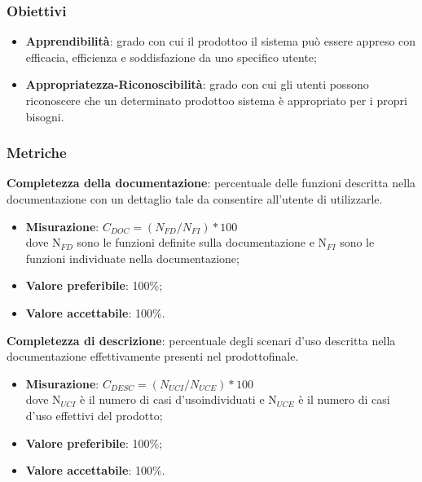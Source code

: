         \subsubsection{Obiettivi}
            \begin{itemize}
                \item \textbf{Apprendibilità}: grado con cui il prodotto\glosp o il sistema può essere appreso con efficacia, efficienza e soddisfazione da uno specifico utente;
                \item \textbf{Appropriatezza-Riconoscibilità}: grado con cui gli utenti possono riconoscere che un determinato prodotto\glosp o sistema è appropriato per i propri bisogni.
            \end{itemize}
        \subsubsection{Metriche}
            \textbf{Completezza della documentazione}: percentuale delle funzioni descritta nella documentazione con un dettaglio tale da consentire all’utente di utilizzarle.
                \begin{itemize}
                    \item \textbf{Misurazione}: $C_{DOC}=(N_{FD}/N_{FI})*100$ \\
                    dove N$_{FD}$ sono le funzioni definite sulla documentazione e N$_{FI}$ sono le funzioni individuate nella documentazione;
                    \item \textbf{Valore preferibile}: 100\%;
                    \item \textbf{Valore accettabile}: 100\%.
                \end{itemize}
            \textbf{Completezza di descrizione}: percentuale degli scenari d’uso descritta nella documentazione effettivamente presenti nel prodotto\glosp finale.
                \begin{itemize}
                    \item \textbf{Misurazione}: $C_{DESC}=(N_{UCI}/N_{UCE})*100$ \\
                    dove N$_{UCI}$ è il numero di casi d'uso\glosp individuati e N$_{UCE}$ è il numero di casi d'uso effettivi del prodotto\glo;
                    \item \textbf{Valore preferibile}: 100\%;
                    \item \textbf{Valore accettabile}: 100\%.
                \end{itemize}
